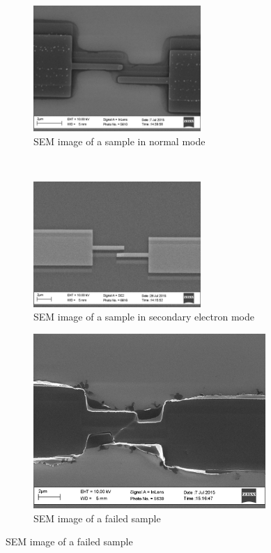             
             \begin{figure}
        \centering
            \begin{subfigure}[t]{0.48\textwidth}
                \centering
                \includegraphics[width=180pt]{SEMexemple.jpg}
                \caption{SEM image of a sample in normal mode}
                \label{SEMexemple}
                \end{subfigure}
                ~
                \begin{subfigure}[t]{0.48\textwidth}
                \centering
                \includegraphics[width=180pt]{SEMexemplese2.jpg}
                \caption{SEM image of a sample in secondary electron mode}
                \label{SEMexemplese2}
                \end{subfigure}
                
                \begin{subfigure}[t]{0.99\textwidth}
                \centering
                \includegraphics[width=250pt]{SEMexemplefail.jpg}
                \caption{SEM image of a failed sample}
                \label{SEMexemplefail}
                \end{subfigure}
            \end{figure}
            
